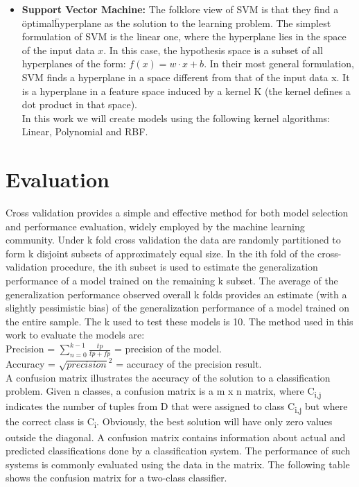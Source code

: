\begin{itemize}
\item \textbf{Support Vector Machine: }
The folklore view of SVM is that they find a \"optimal\" hyperplane as the solution to the learning problem. The simplest formulation of SVM is the linear one, where the hyperplane lies in the space of the input data $x$. In this case, the hypothesis space is a subset of all hyperplanes of the form:
$f(x) = w \cdotp x +b$.
In their most general formulation, SVM finds a hyperplane in a space different from that of the input data x. It is a hyperplane in a feature space induced by a kernel K (the kernel defines a dot product in that space)\cite{SVMEvgeniou}.\\
In this work we will create models using the following kernel algorithms: Linear\cite{SVMTraining}, Polynomial\cite{SVMTraining} and RBF\cite{SVMTraining}.  
\end{itemize}







\section{Evaluation} %
\label{sub:evaluation}
Cross \textendash validation \cite{CrossValidatory} provides a simple and effective method for both model selection and performance evaluation, widely employed by the machine learning community. Under k \textendash fold cross \textendash validation the data are randomly partitioned to form k disjoint subsets of approximately equal size. In the ith fold of the cross-validation procedure, the ith subset is used to estimate the generalization performance of a model trained on the remaining k  subset. The average of the generalization performance observed overall k folds provides an estimate (with a slightly pessimistic bias) of the generalization performance of a model trained on the entire sample.
The k used to test these models is 10.
The method used in this work to evaluate the models are:\\
Precision = \(\sum_{n=0}^{k-1}\frac{tp}{tp+fp} \)  = precision of the model.\\
Accuracy = \( \sqrt{precision} ^ 2\) = accuracy of the precision result.\\


A confusion matrix \cite{CMPatil} illustrates the accuracy of the solution to a classification problem. Given n classes, a confusion matrix is a m x n matrix, where C\textsubscript{i,j} indicates the number of tuples from D that were assigned to class C\textsubscript{i,j} but where the correct class is C\textsubscript{i}.
Obviously, the best solution will have only zero values outside the diagonal.
A confusion matrix contains information about actual and predicted classifications done by a classification system. The performance of such systems is commonly evaluated using the data in the matrix. The following table shows the confusion matrix for a two-class classifier. 

